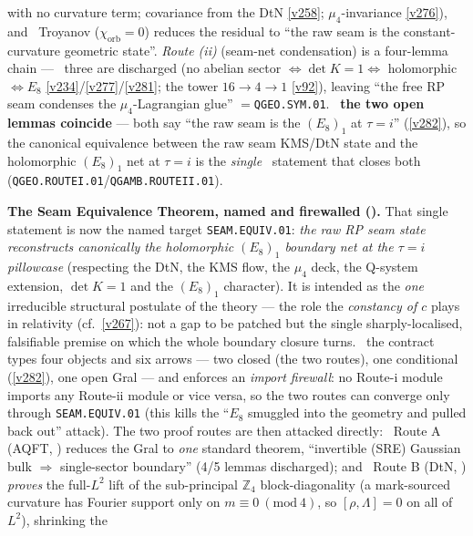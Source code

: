 \documentclass[11pt,a4paper]{article}
\begin{document}
\begin{keybox}
with no curvature term; covariance from the DtN \vref{v258}; $\mu_4$-invariance \vref{v276}), and \mC\ Troyanov
($\chi_{\mathrm{orb}}{=}0$) reduces the residual to ``the raw seam is the constant-curvature geometric state''.
\emph{Route (ii)} (seam-net condensation) is a four-lemma chain --- \mE\ three are discharged (no abelian sector
$\Leftrightarrow\det K{=}1\Leftrightarrow$ holomorphic $\Leftrightarrow E_8$ \vref{v234}/\vref{v277}/\vref{v281};
the tower $16{\to}4{\to}1$ \vref{v92}), leaving ``the free RP seam condenses the $\mu_4$-Lagrangian glue''
$=$\texttt{QGEO.SYM.01}. \mE\ \textbf{the two open lemmas coincide} --- both say ``the raw seam is the
$(E_8)_1$ at $\tau{=}i$'' (\vref{v282}), so the canonical equivalence between the raw seam KMS/DtN state and the
holomorphic $(E_8)_1$ net at $\tau{=}i$ is the \emph{single} \mO\ statement that closes both
(\texttt{QGEO.ROUTEI.01}/\texttt{QGAMB.ROUTEII.01}).
\par\smallskip\noindent\textbf{The Seam Equivalence Theorem, named and firewalled
().} That single statement is now the named target
\texttt{SEAM.EQUIV.01}: \emph{the raw RP seam state reconstructs canonically the holomorphic $(E_8)_1$ boundary
net at the $\tau{=}i$ pillowcase} (respecting the DtN, the KMS flow, the $\mu_4$ deck, the Q-system extension,
$\det K{=}1$ and the $(E_8)_1$ character). It is intended as the \emph{one} irreducible structural postulate of
the theory --- the role the \emph{constancy of $c$} plays in relativity (cf.\ \vref{v267}): not a gap to be
patched but the single sharply-localised, falsifiable premise on which the whole boundary closure turns.
\mE\ the contract types four objects and six arrows --- two closed
(the two routes), one conditional (\vref{v282}), one open Gral --- and enforces an \emph{import firewall}: no
Route-i module imports any Route-ii module or vice versa, so the two routes can converge only through
\texttt{SEAM.EQUIV.01} (this kills the ``$E_8$ smuggled into the geometry and pulled back out'' attack). The two
proof routes are then attacked directly: \mE\ Route A (AQFT, )
reduces the Gral to \emph{one} standard theorem, ``invertible (SRE) Gaussian bulk $\Rightarrow$ single-sector
boundary'' (4/5 lemmas discharged); and \mE\ Route B (DtN, )
\emph{proves} the full-$L^2$ lift of the sub-principal $\mathbb{Z}_4$ block-diagonality (a mark-sourced curvature
has Fourier support only on $m\equiv0\ (\mathrm{mod}\ 4)$, so $[\rho,\Lambda]{=}0$ on all of $L^2$), shrinking the

\end{keybox}
\end{document}
